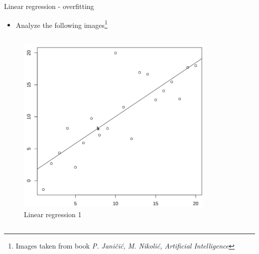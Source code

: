 \documentclass[aspectratio=169]{beamer}
\begin{document}
\begin{frame}{Linear regression - overfitting}
    \begin{itemize}
        \item Analyze the following images\footnote{Images taken from book \textit{P. Janičić, M. Nikolić, Artificial Intelligence}}
    \end{itemize}
    \begin{columns}
    \begin{column}{0.5\textwidth}
        \begin{center}
            \begin{figure}
                \includegraphics[scale=0.28]{./images/linreg.png}
                \caption{Linear regression 1}
            \end{figure}
        \end{center}
    \end{column}
    \begin{column}{0.5\textwidth}  %
        \begin{center}
            \begin{figure}

\end{figure}
\end{center}
\end{column}
\end{columns}
\end{frame}
\end{document}
